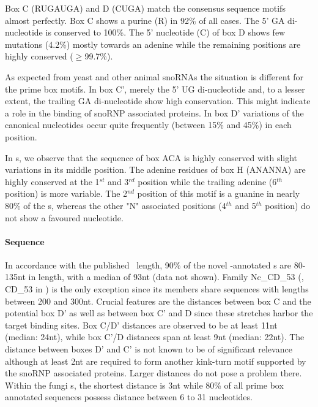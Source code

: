 Box C (RUGAUGA) and D (CUGA) match the consensus sequence motifs
almost perfectly. Box C shows a purine (R) in 92\% of all cases. 
The 5' GA di-nucleotide is conserved to 100\%. 
The 5' nucleotide (C) of box D
shows few mutations (4.2\%) mostly towards an adenine while the
remaining positions are highly conserved ($\ge$99.7\%). 

As expected from yeast and other animal snoRNAs the situation is different for the prime box motifs. 
In box C', merely the 5' UG di-nucleotide and, to a lesser extent, the
trailing GA di-nucleotide show high conservation.
This might indicate a role in the binding of snoRNP associated proteins.
In box D' variations of the canonical nucleotides occur quite
frequently (between 15\% and 45\%) in each position.

In \haca s, we observe that the sequence of box ACA is highly conserved with
slight variations in its middle position. The adenine residues of box H (ANANNA) are highly conserved at the 1$^{st}$ and
3$^{rd}$ position while the trailing adenine (6$^{th}$ position) is more variable. The
2$^{nd}$ position of this motif is a guanine in nearly 80\% of the \haca s, whereas the other "N" associated positions (4$^{th}$ and 5$^{th}$ position) do not show a favoured nucleotide.

\paragraph{\textbf{Sequence}}  In
accordance with the published \cd\ length, 90\% of the novel
\snostrip-annotated  \sno s are 80-135nt in length, with a median of 93nt (data not shown). 
Family Nc\_CD\_53 (\ncr, CD\_53 in \snostrip) is the only exception since its members share sequences with lengths between 200 and 300nt. 
Crucial features are the distances between box C
and the potential box D'  as well as between box C' and D
since these stretches harbor the target binding sites. 
Box C/D' distances are observed to be at least 11nt (median: 24nt), while box C'/D distances span at least 9nt (median: 22nt). 
The distance between boxes D' and C' is not known to be of significant relevance although at least 2nt are required to form another kink-turn motif supported by  the snoRNP associated proteins. 
Larger distances do not pose a problem there. 
Within the fungi \sno s, the shortest distance is 3nt while 80\% of all
prime box annotated sequences possess distance between 6 to 31
nucleotides.

